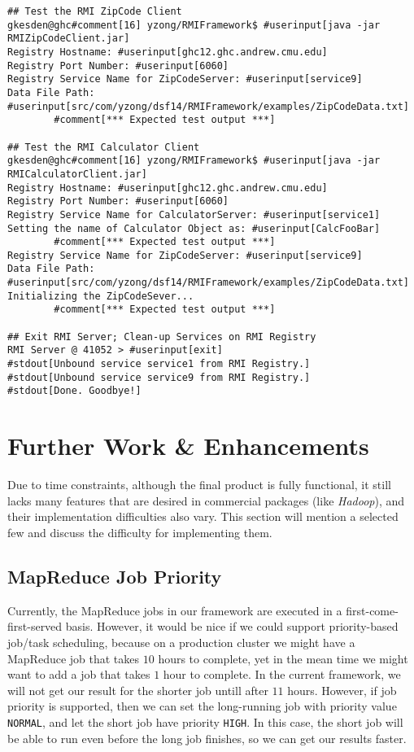 \documentclass{article} %
\begin{document}
{\begin{Verbatim}[fontsize=\small, xleftmargin=-.5in,commandchars=\#\[\]]
## Test the RMI ZipCode Client
gkesden@ghc#comment[16] yzong/RMIFramework$ #userinput[java -jar RMIZipCodeClient.jar]
Registry Hostname: #userinput[ghc12.ghc.andrew.cmu.edu]
Registry Port Number: #userinput[6060]
Registry Service Name for ZipCodeServer: #userinput[service9]
Data File Path: #userinput[src/com/yzong/dsf14/RMIFramework/examples/ZipCodeData.txt]
        #comment[*** Expected test output ***]

## Test the RMI Calculator Client
gkesden@ghc#comment[16] yzong/RMIFramework$ #userinput[java -jar RMICalculatorClient.jar]
Registry Hostname: #userinput[ghc12.ghc.andrew.cmu.edu]
Registry Port Number: #userinput[6060]
Registry Service Name for CalculatorServer: #userinput[service1]
Setting the name of Calculator Object as: #userinput[CalcFooBar]
        #comment[*** Expected test output ***]
Registry Service Name for ZipCodeServer: #userinput[service9]
Data File Path: #userinput[src/com/yzong/dsf14/RMIFramework/examples/ZipCodeData.txt]
Initializing the ZipCodeSever...
        #comment[*** Expected test output ***]
        
## Exit RMI Server; Clean-up Services on RMI Registry
RMI Server @ 41052 > #userinput[exit]
#stdout[Unbound service service1 from RMI Registry.]
#stdout[Unbound service service9 from RMI Registry.]
#stdout[Done. Goodbye!]
\end{Verbatim}
}

\section{Further Work \& Enhancements}

\par\qquad Due to time constraints, although the final product is fully functional, it still lacks many features that are desired in commercial packages (like \emph{Hadoop}), and their implementation difficulties also vary. This section will mention a selected few and discuss the difficulty for implementing them.

\subsection{MapReduce Job Priority}
    \par\qquad Currently, the MapReduce jobs in our framework are executed in a first-come-first-served basis. However, it would be nice if we could support priority-based job/task scheduling, because on a production cluster we might have a MapReduce job that takes $10$ hours to complete, yet in the mean time we might want to add a job that takes $1$ hour to complete. In the current framework, we will not get our result for the shorter job untill after $11$ hours. However, if job priority is supported, then we can set the long-running job with priority value \texttt{NORMAL}, and let the short job have priority \texttt{HIGH}. In this case, the short job will be able to run even before the long job finishes, so we can get our results faster.
    
\end{document}
